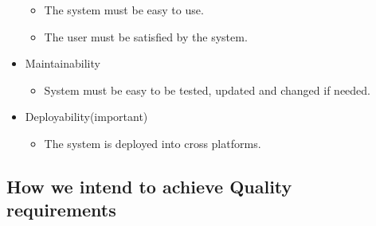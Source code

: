 \documentclass[a4paper,12pt]{article}
\begin{document}
\begin{itemize}
\begin{itemize}
			\item The system must be easy to use.
			\item The user must be satisfied by the system.
		\end{itemize}
	\item Maintainability
		\begin{itemize}
			\item System must be easy to be tested, updated and changed if needed.
		\end{itemize}
	\item Deployability(important)
		\begin{itemize}
			\item The system is deployed into cross platforms.
		\end{itemize}
	\end{itemize}
\subsection{How we intend to achieve Quality requirements}
\end{document}
